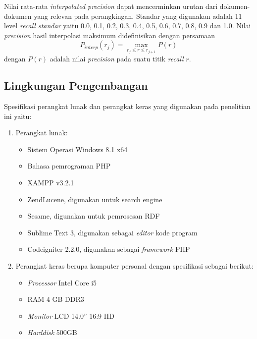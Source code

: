 Nilai rata-rata \textit{interpolated precision} dapat mencerminkan urutan dari dokumen-dokumen yang relevan pada perangkingan. Standar yang digunakan adalah 11 level \textit{recall standar} yaitu 0.0, 0.1, 0.2, 0.3, 0.4, 0.5, 0.6, 0.7, 0.8, 0.9 dan 1.0. Nilai \textit{precision} hasil interpolasi maksimum didefinisikan dengan persamaan
\begin{equation}
P_{interp}(r_j)=\max_{r_j\leq r\leq r_{j+1}} P(r)
\label{eq:interpolasi}
\end{equation}
\noindent dengan $P(r)$ adalah nilai \textit{precision} pada suatu titik \textit{recall} $r$.

\pagebreak %
\subsection*{Lingkungan Pengembangan}
Spesifikasi perangkat lunak dan perangkat keras yang digunakan pada penelitian ini yaitu:
\begin{enumerate}[noitemsep] 
\item Perangkat lunak:
   \begin{itemize}
      \item Sistem Operasi Windows 8.1 x64
      \item Bahasa pemrograman PHP
      \item XAMPP v3.2.1
      \item ZendLucene, digunakan untuk search engine
      \item Sesame, digunakan untuk pemrosesan RDF
      \item Sublime Text 3, digunakan sebagai \textit{editor} kode program
      \item Codeigniter 2.2.0, digunakan sebagai \textit{framework} PHP
   \end{itemize}
\item Perangkat keras berupa komputer personal dengan spesifikasi sebagai berikut:
   \begin{itemize}
      \item \textit{Processor} Intel Core i5
      \item RAM 4 GB DDR3
      \item \textit{Monitor} LCD 14.0” 16:9 HD
      \item \textit{Harddisk} 500GB
   \end{itemize}
\end{enumerate}